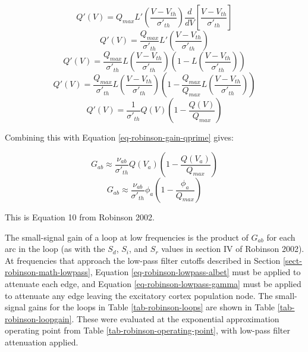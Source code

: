 \begin{equation}
Q'(V) = Q_{max} L' \left ( \frac{V - V_{th}}{\sigma'_{th}} \right )
\frac{d}{dV} \left [ \frac{V - V_{th}}{\sigma'_{th}} \right ]
\end{equation}
%
\begin{equation}
Q'(V) = \frac{Q_{max}}{\sigma'_{th}}
L' \left ( \frac{V - V_{th}}{\sigma'_{th}} \right )
\end{equation}
%
\begin{equation}
Q'(V) = \frac{Q_{max}}{\sigma'_{th}}
L \left ( \frac{V - V_{th}}{\sigma'_{th}} \right )
\left ( 1 - L \left ( \frac{V - V_{th}}{\sigma'_{th}} \right ) \right )
\end{equation}
%
\begin{equation}
Q'(V) = \frac{Q_{max}}{\sigma'_{th}}
L \left ( \frac{V - V_{th}}{\sigma'_{th}} \right )
\left ( 1 - \frac{Q_{max}}{Q_{max}}
L \left ( \frac{V - V_{th}}{\sigma'_{th}} \right ) \right )
\end{equation}
%
\begin{equation}
Q'(V) = \frac{1}{\sigma'_{th}} Q(V) \left ( 1 - \frac{Q(V)}{Q_{max}} \right )
\label{eq-robinson-sigmoid-derivative}
\end{equation}

Combining this with Equation \ref{eq-robinson-gain-qprime} gives:

\begin{equation}
G_{ab} \approx \frac{\nu_{ab}}{\sigma'_{th}}
Q(V_a) \left ( 1 - \frac{Q(V_a)}{Q_{max}} \right )
\end{equation}
%
\begin{equation}
G_{ab} \approx \frac{\nu_{ab}}{\sigma'_{th}}
\phi_a \left ( 1 - \frac{\phi_a}{Q_{max}} \right )
\label{eq-robinson-gain}
\end{equation}

This is Equation 10 from Robinson 2002.

The small-signal gain of a loop at low frequencies is the product of
$G_{ab}$ for each arc in the loop (as with the $S_d$, $S_i$, and $S_r$
values in section IV of Robinson 2002).
At frequencies that approach the low-pass filter cutoffs described in
Section \ref{sect-robinson-math-lowpass}, Equation
\ref{eq-robinson-lowpass-albet} must be applied to attenuate each edge, and
Equation \ref{eq-robinson-lowpass-gamma} must be applied to attenuate any
edge leaving the excitatory cortex population node.
The small-signal gains for the loops in Table \ref{tab-robinson-loops} are
shown in Table \ref{tab-robinson-loopgain}. These were evaluated at the
exponential approximation operating point from
Table \ref{tab-robinson-operating-point}, with low-pass filter attenuation
applied.

